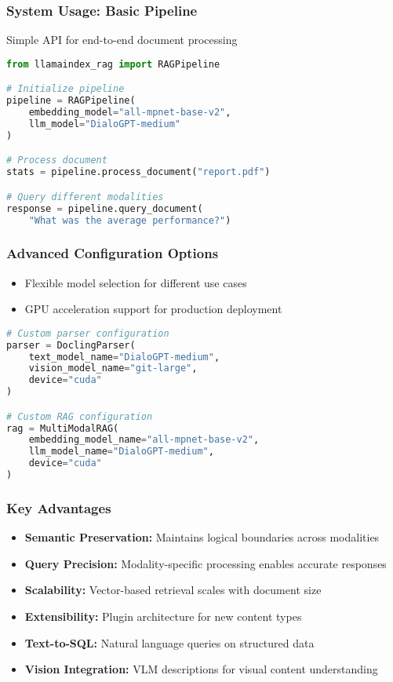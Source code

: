 \begin{frame}[fragile]\frametitle{System Usage: Basic Pipeline}
Simple API for end-to-end document processing

\begin{lstlisting}[language=Python, basicstyle=\tiny]
from llamaindex_rag import RAGPipeline

# Initialize pipeline
pipeline = RAGPipeline(
    embedding_model="all-mpnet-base-v2",
    llm_model="DialoGPT-medium"
)

# Process document
stats = pipeline.process_document("report.pdf")

# Query different modalities
response = pipeline.query_document(
    "What was the average performance?")
\end{lstlisting}
\end{frame}

\begin{frame}[fragile]\frametitle{Advanced Configuration Options}

\begin{itemize}
\item Flexible model selection for different use cases
\item GPU acceleration support for production deployment
\end{itemize}

\begin{lstlisting}[language=Python, basicstyle=\tiny]
# Custom parser configuration
parser = DoclingParser(
    text_model_name="DialoGPT-medium",
    vision_model_name="git-large",
    device="cuda"
)

# Custom RAG configuration
rag = MultiModalRAG(
    embedding_model_name="all-mpnet-base-v2",
    llm_model_name="DialoGPT-medium",
    device="cuda"
)
\end{lstlisting}

\end{frame}

\begin{frame}[fragile]\frametitle{Key Advantages}
\begin{itemize}
\item \textbf{Semantic Preservation:} Maintains logical boundaries across modalities
\item \textbf{Query Precision:} Modality-specific processing enables accurate responses
\item \textbf{Scalability:} Vector-based retrieval scales with document size
\item \textbf{Extensibility:} Plugin architecture for new content types
\item \textbf{Text-to-SQL:} Natural language queries on structured data
\item \textbf{Vision Integration:} VLM descriptions for visual content understanding
\end{itemize}
\end{frame}

